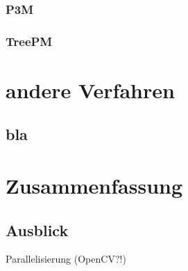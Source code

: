 \documentclass{scrartcl}
\begin{document}
\subsubsection{P3M}
\subsubsection{TreePM}

\section{andere Verfahren}
\subsection{bla}

\section{Zusammenfassung}
\subsection{Ausblick}
Parallelisierung (OpenCV?!)
\end{document}
